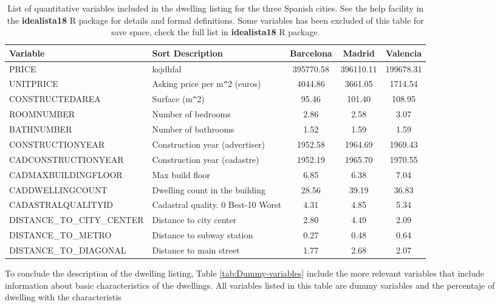 \documentclass[Royal,times,sageh]{sagej}
\begin{document}
\begin{table}[ht]
\centering
\fontsize{8}{10}\selectfont
\begin{tabular}{>{\raggedright\arraybackslash}p{13em}>{\raggedright\arraybackslash}p{14em}ccc}
  \hline
Variable & Sort Description & Barcelona & Madrid & Valencia \\ 
  \hline
PRICE & ksjdhfal & 395770.58 & 396110.11 & 199678.31 \\ 
  UNITPRICE & Asking price per m\verb|^|2 (euros) & 4044.86 & 3661.05 & 1714.54 \\ 
  CONSTRUCTEDAREA & Surface (m\verb|^|2) & 95.46 & 101.40 & 108.95 \\ 
  ROOMNUMBER & Number of bedrooms & 2.86 & 2.58 & 3.07 \\ 
  BATHNUMBER & Number of bathrooms & 1.52 & 1.59 & 1.59 \\ 
  CONSTRUCTIONYEAR & Construction year (advertiser) & 1952.58 & 1964.69 & 1969.43 \\ 
  CADCONSTRUCTIONYEAR & Construction year (cadastre) & 1952.19 & 1965.70 & 1970.55 \\ 
  CADMAXBUILDINGFLOOR & Max build floor & 6.85 & 6.38 & 7.04 \\ 
  CADDWELLINGCOUNT & Dwelling count in the building & 28.56 & 39.19 & 36.83 \\ 
  CADASTRALQUALITYID & Cadastral quality. 0 Best-10 Worst & 4.31 & 4.85 & 5.34 \\ 
  DISTANCE\_TO\_CITY\_CENTER & Distance to city center & 2.80 & 4.49 & 2.09 \\ 
  DISTANCE\_TO\_METRO & Distance to subway station & 0.27 & 0.48 & 0.64 \\ 
  DISTANCE\_TO\_DIAGONAL & Distance to main street & 1.77 & 2.68 & 2.07 \\ 
   \hline
\end{tabular}
\caption{List of quantitative variables included in the dwelling listing for the three Spanish cities. See the help facility in the \textbf{idealista18} R package for details and formal definitions. Some variables has been excluded of this table for save space, check the full list in  \textbf{idealista18} R package. \label{tab:variables}} 
\end{table}

To conclude the description of the dwelling listing, Table
\ref{tab:Dummy-variables} include the more relevant variables that
include information about basic characteristics of the dwellings. All
variables listed in this table are dummy variables and the percentaje of
dwelling with the characteristis
\end{document}
